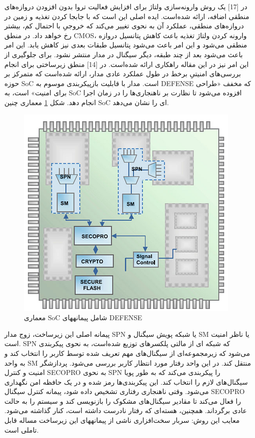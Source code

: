 در [17] یک روش وارونه‌سازی ولتاژ برای افزایش فعالیت تروا بدون افزودن دروازه‌های منطقی اضافه، ارائه شده‌است. ایده اصلی این است که با جابجا کردن تغذیه و زمین در دروازه‌های منطقی، عملکرد آن به نحوی تغییر می‌کند که خروجیِ با احتمال کم، بیشتر رخ خواهد داد. 
در منطق CMOS، وارونه کردن ولتاژ تغذیه باعث کاهش پتانسیل دروازه منطقی می‌شود و این امر باعث می‌شود پتانسیل طبقات بعدی نیز کاهش یابد. این امر باعث می‌شود بعد از چند طبقه، دیگر سیگنال در مدار منتشر نشود. برای جلوگیری از این امر نیز در این مقاله راهکاری ارائه شده‌است.
در [14] منطق زیرساختی برای انجام بررسی‌های امنیتیِ برخط در طول عملکرد عادی مدار، ارائه شده‌است که متمرکز بر حوزه SoC است. مدار با قابلیت بازپیکربندی موسوم به DEFENSE که مخفف «طراحی برای امنیت» است، به SoC افزوده می‌شود تا نظارت بر ناهنجاری‌ها را در زمان اجرا انجام دهد. شکل \ref{fig6-5} معماری چنین SoC ای را نشان می‌دهد.
 \begin{figure}
\begin{center}
\includegraphics[scale=0.6]{figs/fig6-5.png}
\caption{معماری SoC شامل پیمانه­های DEFENSE}
\label{fig6-5}
\end{center}
\end{figure} 

پیمانه اصلی این زیرساخت، زوج  مدار SPN یا شبکه پویش سیگنال و SM یا ناظر امنیت است. SPN که شبکه ای از مالتی پلکسرهای توزیع شده‌است، به نحوی پیکربندی می‌شود که زیرمجموعه‌ای از سیگنال‌های مهم تعریف شده توسط کاربر را انتخاب کند و به واحد SM منتقل کند. در این واحد رفتار مورد انتظار کاربر بررسی می‌شود. پردازشگر امنیت و کنترل SECOPRO به نحوی SPN را پیکربندی می‌کند که به طور پویا سیگنال‌های لازم را انتخاب کند. این پیکربندی‌ها رمز شده و در یک حافظه امن نگهداری می‌شود. وقتی ناهنجاری رفتاری تشخیص داده شود، پیمانه کنترل سیگنال SECOPRO را فعال می‌کند تا مقادیر سیگنال‌های مشکوک را بازنویسی کند و سیستم را به حالت عادی برگرداند. همچنین، هسته‌ای که رفتار نادرست داشته است، کنار گذاشته می‌شود. 
معایب این روش:
سربار سخت‌افزاری ناشی از پیمانه­های این زیرساخت مساله قابل تاملی است.

